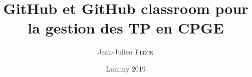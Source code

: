 






\title[GitHub en CPGE]{GitHub et GitHub classroom pour la gestion des TP en CPGE}
\author{Jean-Julien \textsc{Fleck}} %
\date{Luminy 2019} 

















